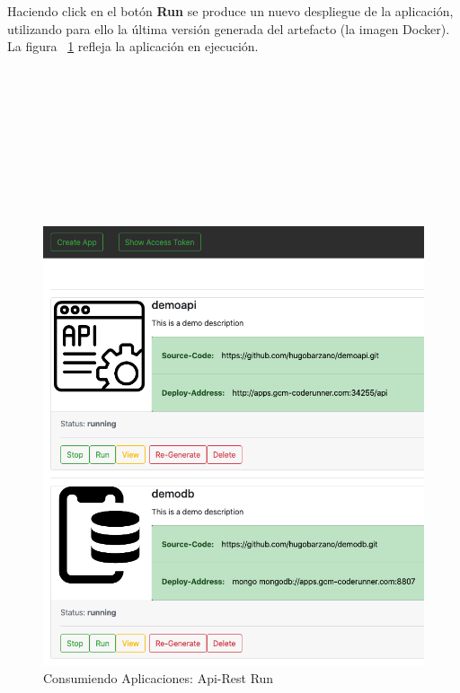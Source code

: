 \documentclass[a4paper,11pt]{book}
\begin{document}
Haciendo click en el botón \textbf{Run} se produce un nuevo despliegue de la aplicación, utilizando para ello la última versión generada del artefacto (la imagen Docker). La figura ~\ref{1_4} refleja la aplicación en ejecución. 
~\\
~\\
~\\
~\\
~\\
~\\
~\\
~\\
~\\
~\\
\begin{figure}[H]
\centering
\includegraphics[scale=0.4]{imagenes/casouso_a/1_4.png}
\caption{ Consumiendo Aplicaciones: Api-Rest Run  }
\label{1_4}
\end{figure}
\end{document}
